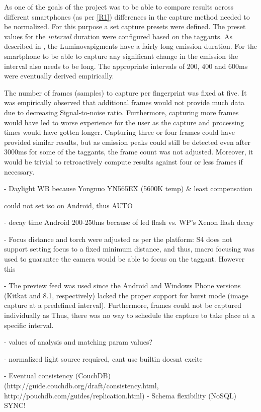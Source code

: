 \documentclass[thesis.tex]{subfiles}
\begin{document}
As one of the goals of the project was to be able to compare results across different smartphones (as per \ref{R1}) differences in the capture method needed to be normalized. For this purpose a set capture presets were defined. The preset values for the \emph{interval} duration were configured based on the taggants. As described in \cite{luminova}, the Luminova\textregistered pigments have a fairly long emission duration. For the smartphone to be able to capture any significant change in the emission the interval also needs to be long. The appropriate intervals of 200, 400 and 600ms were eventually derived empirically.

The number of frames (samples) to capture per fingerprint was fixed at five. It was empirically observed that additional frames would not provide much data due to decreasing Signal-to-noise ratio. Furthermore, capturing more frames would have led to worse experience for the user as the capture and processing times would have gotten longer. Capturing three or four frames could have provided similar results, but as emission peaks could still be detected even after 3000ms for some of the taggants, the frame count was not adjusted. Moreover, it would be trivial to retroactively compute results against four or less frames if necessary.


- Daylight WB because Yongnuo YN565EX (5600K temp) \& least compensation

could not set iso on Android, thus AUTO

- decay time Android 200-250ms because of led flash vs. WP's Xenon flash decay

- Focus distance and torch were adjusted as per the platform: S4 does not support setting focus to a fixed minimum distance, and thus, macro focusing was used to guarantee the camera would be able to focus on the taggant. However this

- The preview feed was used since the Android and Windows Phone versions (Kitkat and 8.1, respectively) lacked the proper support for burst mode (image capture at a predefined interval). Furthermore, frames could not be captured individually as Thus, there was no way to schedule the capture to take place at a specific interval.

- values of analysis and matching param values?

- normalized light source required, cant use builtin doesnt excite

- Eventual consistency (CouchDB) (http://guide.couchdb.org/draft/consistency.html, http://pouchdb.com/guides/replication.html)
- Schema flexibility (NoSQL) SYNC!
\end{document}
